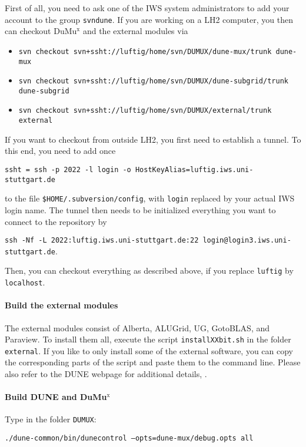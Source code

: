 First of all, you need to ask one of the IWS system administrators to 
add your account to the group \texttt{svndune}. 
If you are working on a LH2 computer, you then can checkout DuMu$^\text{x}$ 
and the external modules via 
\begin{itemize}
\item \texttt{svn checkout svn+ssht://luftig/home/svn/DUMUX/dune-mux/trunk dune-mux}
\item \texttt{svn checkout svn+ssht://luftig/home/svn/DUMUX/dune-subgrid/trunk dune-subgrid}
\item \texttt{svn checkout svn+ssht://luftig/home/svn/DUMUX/external/trunk external}
\end{itemize} 
If you want to checkout from outside LH2, you first need to establish a tunnel. 
To this end, you need to add once 
\begin{center}
\texttt{ssht = ssh -p 2022 -l login -o HostKeyAlias=luftig.iws.uni-stuttgart.de} 
\end{center}
to the file \texttt{\$HOME/.subversion/config}, with \texttt{login} replaced 
by your actual IWS login name. 
The tunnel then needs to be initialized everything you want 
to connect to the repository by 
\begin{center}
\texttt{ssh -Nf -L 2022:luftig.iws.uni-stuttgart.de:22 login@login3.iws.uni-stuttgart.de}.
\end{center}
Then, you can checkout everything as described above, if you replace \texttt{luftig} 
by \texttt{localhost}. 

\paragraph{Build the external modules} 
The external modules consist of Alberta, ALUGrid, UG, GotoBLAS, and Paraview. 
To install them all, execute the script \texttt{installXXbit.sh} in the folder \texttt{external}. 
If you like to only install some of the external software, you can copy the corresponding 
parts of the script and paste them to the command line. 
Please also refer to the DUNE webpage for additional details, \cite{DUNE-HP}. 

\paragraph{Build DUNE and DuMu$^\text{x}$}
Type in the folder \texttt{DUMUX}: 
\begin{center}
\texttt{./dune-common/bin/dunecontrol --opts=dune-mux/debug.opts all}
\end{center}

